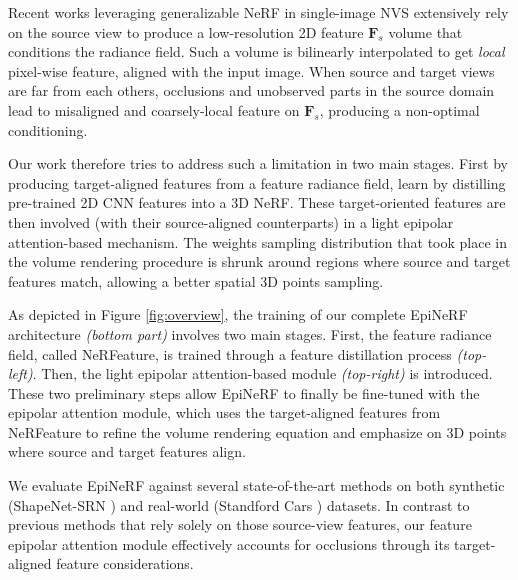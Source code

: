 Recent works \citep{yu2021pixelnerf,li2022symmnerf,lin2023vision} leveraging generalizable NeRF in single-image \ac{NVS} extensively rely on the source view to produce a low-resolution 2D feature $\textbf{F}_{s}$ volume that conditions the radiance field. Such a volume is bilinearly interpolated to get \textit{local} pixel-wise feature, aligned with the input image. When source and target views are far from each others, occlusions and unobserved parts in the source domain lead to misaligned and coarsely-local feature on $\textbf{F}_{s}$, producing a non-optimal conditioning. 

Our work therefore tries to address such a limitation in two main stages. First by producing target-aligned features from a feature radiance field, learn by distilling pre-trained 2D \ac{CNN} features into a 3D \ac{NeRF}. These target-oriented features are then involved (with their source-aligned counterparts) in a light epipolar attention-based mechanism. The weights sampling distribution that took place in the volume rendering procedure is shrunk around regions where source and target features match, allowing a better spatial 3D points sampling.

As depicted in Figure \ref{fig:overview}, the training of our complete EpiNeRF architecture \textit{(bottom part)} involves two main stages.  First, the feature radiance field, called NeRFeature, is trained through a feature distillation process \textit{(top-left)}. Then, the light epipolar attention-based module \textit{(top-right)} is introduced. These two preliminary steps allow EpiNeRF to finally be fine-tuned with the epipolar attention module, which uses the target-aligned features from NeRFeature to refine the volume rendering equation and emphasize on 3D points where source and target features align.
 
We evaluate EpiNeRF against several state-of-the-art methods on both synthetic (ShapeNet-SRN \citep{sitzmann2019scene}) and real-world (Standford Cars \citep{krause20133d}) datasets. In contrast to previous methods that rely solely on those source-view features, our feature epipolar attention module effectively accounts for occlusions through its target-aligned feature considerations. 

